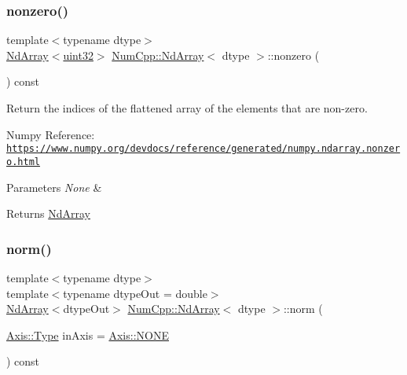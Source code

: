 \subsubsection{\texorpdfstring{nonzero()}{nonzero()}}
{\footnotesize\ttfamily template$<$typename dtype$>$ \\
\mbox{\hyperlink{class_num_cpp_1_1_nd_array}{Nd\+Array}}$<$\mbox{\hyperlink{namespace_num_cpp_a36f388e948380413c63011cab9b7fbd5}{uint32}}$>$ \mbox{\hyperlink{class_num_cpp_1_1_nd_array}{Num\+Cpp\+::\+Nd\+Array}}$<$ dtype $>$\+::nonzero (\begin{DoxyParamCaption}{ }\end{DoxyParamCaption}) const\hspace{0.3cm}{\ttfamily [inline]}}

Return the indices of the flattened array of the elements that are non-\/zero.

Numpy Reference\+: \href{https://www.numpy.org/devdocs/reference/generated/numpy.ndarray.nonzero.html}{\tt https\+://www.\+numpy.\+org/devdocs/reference/generated/numpy.\+ndarray.\+nonzero.\+html}


\begin{DoxyParams}{Parameters}
{\em None} & \\
\hline
\end{DoxyParams}
\begin{DoxyReturn}{Returns}
\mbox{\hyperlink{class_num_cpp_1_1_nd_array}{Nd\+Array}} 
\end{DoxyReturn}
\mbox{\label{class_num_cpp_1_1_nd_array_a5d84832ed56a4908f45533a1f6663b3c}} 
\subsubsection{\texorpdfstring{norm()}{norm()}}
{\footnotesize\ttfamily template$<$typename dtype$>$ \\
template$<$typename dtype\+Out  = double$>$ \\
\mbox{\hyperlink{class_num_cpp_1_1_nd_array}{Nd\+Array}}$<$dtype\+Out$>$ \mbox{\hyperlink{class_num_cpp_1_1_nd_array}{Num\+Cpp\+::\+Nd\+Array}}$<$ dtype $>$\+::norm (\begin{DoxyParamCaption}\item[{\mbox{\hyperlink{struct_num_cpp_1_1_axis_ac10eb76f8631762d9ed70c40c42ca6cb}{Axis\+::\+Type}}}]{in\+Axis = {\ttfamily \mbox{\hyperlink{struct_num_cpp_1_1_axis_ac10eb76f8631762d9ed70c40c42ca6cba747ae657022cca1d87702b56d0c038e9}{Axis\+::\+N\+O\+NE}}} }\end{DoxyParamCaption}) const\hspace{0.3cm}{\ttfamily [inline]}}

